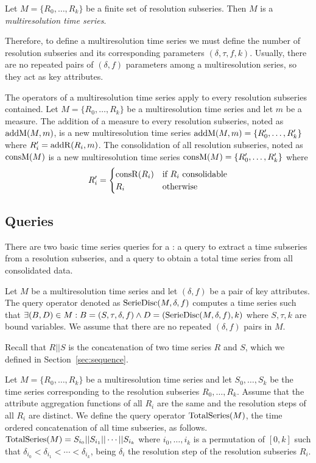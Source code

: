 \begin{definition}
  Let $M=\{R_0, \dots, R_k\}$ be a finite set of resolution
  subseries. Then $M$ is a \emph{multiresolution time series}.
\end{definition}

Therefore, to define a multiresolution time series we must define the
number of resolution subseries and its corresponding parameters
$(\delta,\tau,f,k)$.  Usually, there are no repeated pairs of
$(\delta,f)$ parameters among a multiresolution series, so they act as
key attributes.

The operators of a multiresolution time series apply to every
resolution subseries contained. Let
$M=\{R_0,\allowbreak\dots,\allowbreak R_k\}$ be a multiresolution time
series and let $m$ be a measure. The addition of a measure to every
resolution subseries, noted as $\operatorname{addM}(M,m)$, is a new multiresolution
time series $\operatorname{addM}(M,m)=\{R'_0, \dots,\allowbreak R'_k\}$ where
$R'_i=\operatorname{addR}(R_i,m)$. The consolidation of all resolution subseries,
noted as $\operatorname{consM}(M)$ is a new multiresolution time series
$\operatorname{consM}(M)=\{R'_0,\allowbreak\dots,\allowbreak R'_k\}$ where
\[R'_i=
\begin{cases}
\operatorname{consR}(R_i) & \text{if } R_i \text{ consolidable}\\
 R_i & \text{otherwise}
\end{cases}
\]


\subsection{Queries}

There are two basic time series queries for a : a query to
extract a time subseries from a resolution subseries, and a query to
obtain a total time series from all consolidated data.

Let $M$ be a multiresolution time series and let $(\delta,f)$ be a
pair of key attributes.  The query operator denoted as
$\operatorname{SerieDisc}(M,\delta,f)$ computes a time series such that $\exists
(B,D) \in M: B=(S,\tau,\delta,f) \wedge D=(\operatorname{SerieDisc}(M,\delta,f), k)
$ where $S,\tau,k$ are bound variables.  We assume that there are no
repeated $(\delta,f)$ pairs in $M$.

Recall that $R||S$ is the concatenation of two time series
$R$ and $S$, which we defined in Section~\ref{sec:sequence}.

Let $M=\{R_0,\dots,R_k\}$ be a multiresolution time series and let
$S_0, \dots, S_k$ be the time series corresponding to the resolution
subseries $R_0,\dots,R_k$. Assume that the attribute aggregation
functions of all $R_i$ are the same and the resolution steps of all
$R_i$ are distinct. 
%
We define the query operator $\operatorname{TotalSeries}(M)$, the time ordered
concatenation of all time subseries, as follows.
%
$\operatorname{TotalSeries}(M) = S_{i_0} || S_{i_1} || \cdots || S_{i_k}$
%
where $i_0,\dots,i_k$ is a permutation of $[0,k]$ such that
$\delta_{i_0} < \delta_{i_1} < \cdots < \delta_{i_k}$, being $\delta_i$
the resolution step of the resolution subseries $R_i$.

